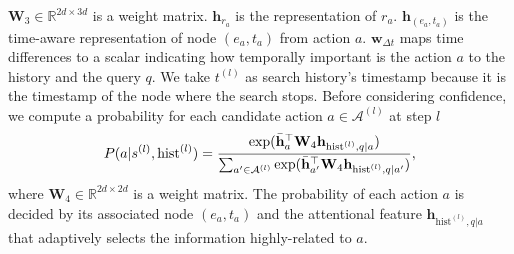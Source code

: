 \documentclass[runningheads]{llncs}
\begin{document}
$\mathbf{W}_3 \in \mathbb{R}^{2d\times3d}$ is a weight matrix. $\mathbf{h}_{r_a}$ is the representation of $r_a$. $\mathbf{h}_{(e_a, t_a)}$ is the time-aware representation of node $(e_a, t_a)$ from action $a$. 
$\mathbf{w}_{\Delta t}$ maps time differences to a scalar indicating how 
temporally important is the action $a$ to the history and the query $q$. 
We take $t^{(l)}$ as search history's timestamp because it is the timestamp of the node where the search stops.
Before considering confidence, we compute a probability for each candidate action $a \in \mathcal{A}^{(l)}$ at step $l$
\begin{equation}
\label{eq: prob before confidence}
    P(a|s^{(l)}, \text{hist}^{(l)}) = \frac{\text{exp}({\Bar{\mathbf{h}}_a}^\top \mathbf{W}_4 \mathbf{h}_{\text{hist}^{(l)}, q|a})}{\sum_{a' \in \mathcal{A}^{(l)}} \text{exp}({\Bar{\mathbf{h}}_{a'}}^\top \mathbf{W}_4 \mathbf{h}_{\text{hist}^{(l)}, q|a'})},
\end{equation}
where $\mathbf{W}_4 \in \mathbb{R}^{2d \times 2d}$ is a weight matrix. The probability of each action $a$ is 
decided by its associated node $(e_a, t_a)$ and the attentional feature $\mathbf{h}_{\text{hist}^{(l)}, q|a}$ 
that adaptively selects the information highly-related to $a$.
\end{document}
